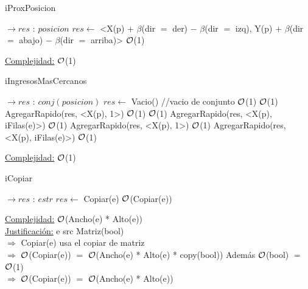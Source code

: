 \begin{Representacion}
\begin{Algoritmos}
	\begin{algorithm}[H]
		\caption{iProxPosicion}
		\begin{algorithmic}[1]
			 $\to res$ : $posicion$
				\State $res \gets$ <X(p) $+$ $\beta$(dir $=$ der) $-$ $\beta$(dir $= $ izq), Y(p) $+$ $\beta$(dir $=$ abajo) $-$ $\beta$(dir $=$ arriba)> \Comment $\mathcal{O}$(1)
			\EndProcedure		
		\end{algorithmic}
		\underline{Complejidad:} $\mathcal{O}$(1)
	\end{algorithm}
				
	\begin{algorithm}[H]
		\caption{iIngresosMasCercanos}
		\begin{algorithmic}[1]
			 $\to res$ : $conj(posicion)$
				\State $res \gets$ Vacio() //vacio de conjunto \Comment $\mathcal{O}$(1)
				 \Comment $\mathcal{O}$(1)
					\State AgregarRapido(res, <X(p), 1>) \Comment $\mathcal{O}$(1)
				\Else
					 \Comment $\mathcal{O}$(1)
						\State AgregarRapido(res, <X(p), iFilas(e)>) \Comment $\mathcal{O}$(1)
					\Else
						\State AgregarRapido(res, <X(p), 1>) \Comment $\mathcal{O}$(1)
						\State AgregarRapido(res, <X(p), iFilas(e)>) \Comment $\mathcal{O}$(1)
					\EndIf				
				\EndIf
			\EndProcedure		
		\end{algorithmic}
		\underline{Complejidad:} $\mathcal{O}$(1)
	\end{algorithm}
	
	\begin{algorithm}[H]
		\caption{iCopiar}
		\begin{algorithmic}[1]
			 $\to res$ : $estr$
				\State $res \gets$ Copiar(e) \Comment $\mathcal{O}$(Copiar(e))
			\EndProcedure
		\end{algorithmic}
		\underline{Complejidad:} $\mathcal{O}$(Ancho(e) * Alto(e))\\
		\underline{Justificación:} e src Matriz(bool)\\
		\tab $\Rightarrow$ Copiar(e) usa el copiar de matriz\\
		\tab $\Rightarrow$ $\mathcal{O}$(Copiar(e)) $=$ $\mathcal{O}$(Ancho(e) * Alto(e) * copy(bool)) \tab \tab Además $\mathcal{O}$(bool) $=$ $\mathcal{O}$(1)\\
		\tab $\Rightarrow$ $\mathcal{O}$(Copiar(e)) $=$ $\mathcal{O}$(Ancho(e) * Alto(e))
	\end{algorithm}	
	
\end{Algoritmos}
	    
    
\end{Representacion}